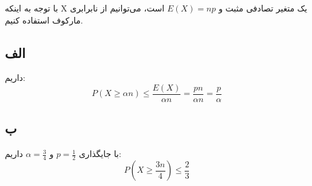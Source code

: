 با توجه به اینکه X یک متغیر تصادفی مثبت و 
$
E(X) = np
$
است، می‌توانیم از نابرابری مارکوف استفاده کنیم.

\subsection*{الف}
داریم:
$$
P(X \ge \alpha n) \le \frac{E(X)}{\alpha n} = \frac{pn}{\alpha n} = \frac{p}{\alpha}
$$

\subsection*{ب}
با جایگذاری 
$
p = \frac{1}{2}
$
و 
$
\alpha = \frac{3}{4}
$
داریم:
$$
P(X \ge \frac{3n}{4} ) \le \frac{2}{3}
$$
